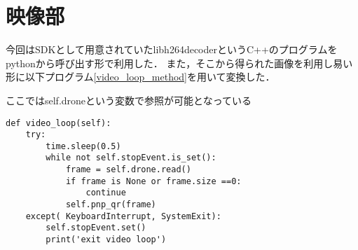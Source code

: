 \section{映像部}
\label{implement_video}
今回はSDKとして用意されていたlibh264decoderというC++のプログラムをpythonから呼び出す形で利用した．
また，そこから得られた画像を利用し易い形に以下プログラム\ref{video_loop_method}を用いて変換した．

ここではself.droneという変数で参照が可能となっている
\begin{lstlisting}[caption=video loop method,label=video_loop_method]
def video_loop(self):
    try: 
        time.sleep(0.5)
        while not self.stopEvent.is_set():                
            frame = self.drone.read()
            if frame is None or frame.size ==0:
                continue
            self.pnp_qr(frame)
    except( KeyboardInterrupt, SystemExit):
        self.stopEvent.set()
        print('exit video loop')
\end{lstlisting}
